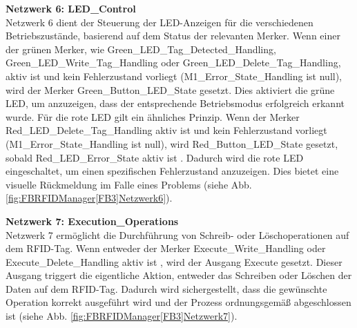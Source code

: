 \textbf{Netzwerk 6: LED\_Control}\\
Netzwerk 6 dient der Steuerung der LED-Anzeigen für die verschiedenen Betriebszustände, basierend auf dem Status der relevanten Merker. Wenn einer der grünen Merker, wie Green\_LED\_Tag\_Detected\_Handling, Green\_LED\_Write\_Tag\_Handling oder Green\_LED\_Delete\_Tag\_Handling, aktiv ist  und kein Fehlerzustand vorliegt (M1\_Error\_State\_Handling ist null), wird der Merker Green\_Button\_LED\_State gesetzt. Dies aktiviert die grüne LED, um anzuzeigen, dass der entsprechende Betriebsmodus erfolgreich erkannt wurde.
Für die rote LED gilt ein ähnliches Prinzip. Wenn der Merker Red\_LED\_Delete\_Tag\_Handling aktiv ist und kein Fehlerzustand vorliegt (M1\_Error\_State\_Handling ist null), wird Red\_Button\_LED\_State gesetzt, sobald Red\_LED\_Error\_State aktiv ist . Dadurch wird die rote LED eingeschaltet, um einen spezifischen Fehlerzustand anzuzeigen. Dies bietet eine visuelle Rückmeldung im Falle eines Problems (siehe Abb. \ref{fig:FBRFIDManager[FB3]Netzwerk6}).

\textbf{Netzwerk 7: Execution\_Operations}\\
Netzwerk 7 ermöglicht die Durchführung von Schreib- oder Löschoperationen auf dem RFID-Tag. Wenn entweder der Merker Execute\_Write\_Handling oder Execute\_Delete\_Handling aktiv ist , wird der Ausgang Execute gesetzt. Dieser Ausgang triggert die eigentliche Aktion, entweder das Schreiben oder Löschen der Daten auf dem RFID-Tag. Dadurch wird sichergestellt, dass die gewünschte Operation korrekt ausgeführt wird und der Prozess ordnungsgemäß abgeschlossen ist (siehe Abb. \ref{fig:FBRFIDManager[FB3]Netzwerk7}).
